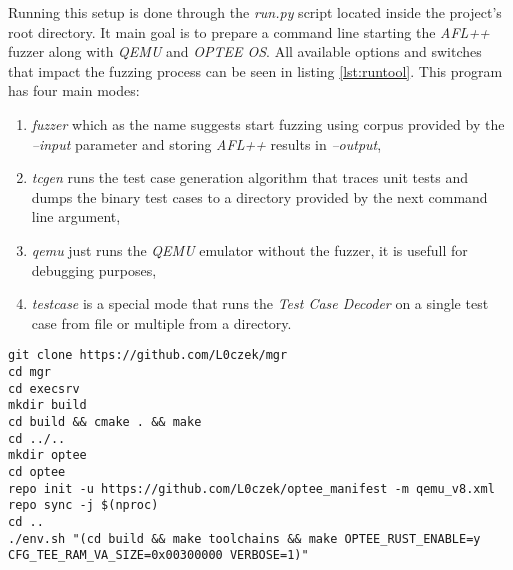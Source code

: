 Running this setup is done through the \textit{run.py} script located inside the project's root directory. It main goal is to prepare a command line starting the \textit{AFL++} fuzzer along with \textit{QEMU} and \textit{OPTEE OS}. All available options and switches that impact the fuzzing process can be seen in listing \ref{lst:runtool}. This program has four main modes:
\begin{enumerate}
    \item \textit{fuzzer} which as the name suggests start fuzzing using corpus provided by the \textit{--input} parameter and storing \textit{AFL++} results in \textit{--output},
    \item \textit{tcgen} runs the test case generation algorithm that traces unit tests and dumps the binary test cases to a directory provided by the next command line argument,
    \item \textit{qemu} just runs the \textit{QEMU} emulator without the fuzzer, it is usefull for debugging purposes,
    \item \textit{testcase} is a special mode that runs the \textit{Test Case Decoder} on a single test case from file or multiple from a directory.
\end{enumerate}

\begin{lstlisting}[caption={Building the fuzzing setup}, label={lst:build}]
git clone https://github.com/L0czek/mgr
cd mgr
cd execsrv
mkdir build
cd build && cmake . && make
cd ../..
mkdir optee
cd optee
repo init -u https://github.com/L0czek/optee_manifest -m qemu_v8.xml
repo sync -j $(nproc)
cd ..
./env.sh "(cd build && make toolchains && make OPTEE_RUST_ENABLE=y CFG_TEE_RAM_VA_SIZE=0x00300000 VERBOSE=1)"
\end{lstlisting}


